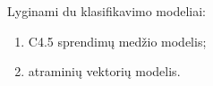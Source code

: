 
Lyginami du klasifikavimo modeliai:
\begin{enumerate}
\item C4.5 sprendimų medžio modelis;
\item atraminių vektorių modelis.
\end{enumerate}


